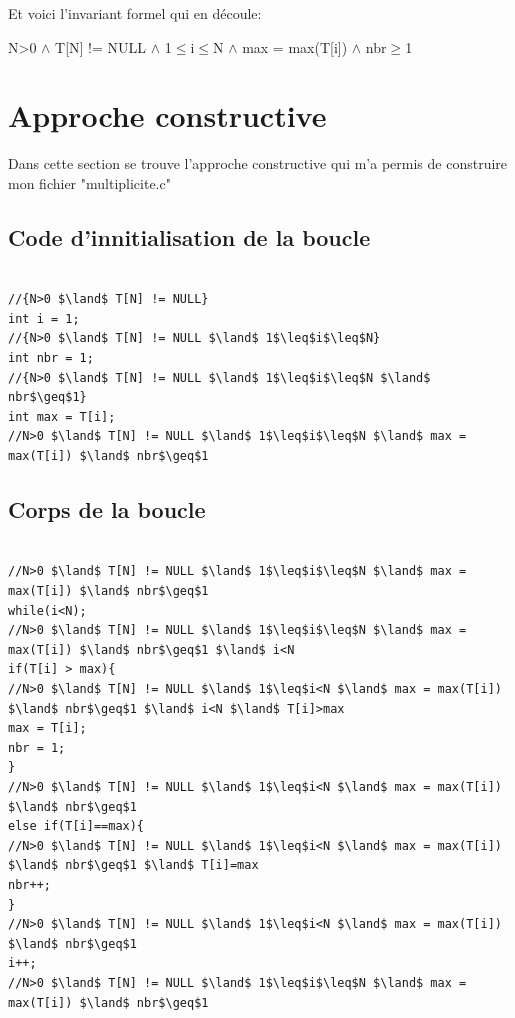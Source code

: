 \documentclass[a4paper, 11pt, oneside]{article}
\begin{document}
Et voici l'invariant formel qui en découle:

\begin{center}

N>0 $\land$ T[N] != NULL $\land$ 1$\leq$i$\leq$N $\land$ max = max(T[i]) $\land$ nbr$\geq$1

\end{center}

\section{Approche constructive}

Dans cette section se trouve l'approche constructive qui m'a permis de construire mon fichier "multiplicite.c" 
\subsection{Code d'innitialisation de la boucle}

\begin{lstlisting}[caption={Code d'innitialisation de la boucle}]

//{N>0 $\land$ T[N] != NULL}
int i = 1;
//{N>0 $\land$ T[N] != NULL $\land$ 1$\leq$i$\leq$N}
int nbr = 1;
//{N>0 $\land$ T[N] != NULL $\land$ 1$\leq$i$\leq$N $\land$ nbr$\geq$1}
int max = T[i];
//N>0 $\land$ T[N] != NULL $\land$ 1$\leq$i$\leq$N $\land$ max = max(T[i]) $\land$ nbr$\geq$1

\end{lstlisting}

\subsection{Corps de la boucle}

\begin{lstlisting}[caption={Corps de la boucle}]

//N>0 $\land$ T[N] != NULL $\land$ 1$\leq$i$\leq$N $\land$ max = max(T[i]) $\land$ nbr$\geq$1
while(i<N);
//N>0 $\land$ T[N] != NULL $\land$ 1$\leq$i$\leq$N $\land$ max = max(T[i]) $\land$ nbr$\geq$1 $\land$ i<N
if(T[i] > max){
//N>0 $\land$ T[N] != NULL $\land$ 1$\leq$i<N $\land$ max = max(T[i]) $\land$ nbr$\geq$1 $\land$ i<N $\land$ T[i]>max
max = T[i];
nbr = 1;
}
//N>0 $\land$ T[N] != NULL $\land$ 1$\leq$i<N $\land$ max = max(T[i]) $\land$ nbr$\geq$1
else if(T[i]==max){
//N>0 $\land$ T[N] != NULL $\land$ 1$\leq$i<N $\land$ max = max(T[i]) $\land$ nbr$\geq$1 $\land$ T[i]=max
nbr++;
}
//N>0 $\land$ T[N] != NULL $\land$ 1$\leq$i<N $\land$ max = max(T[i]) $\land$ nbr$\geq$1
i++;
//N>0 $\land$ T[N] != NULL $\land$ 1$\leq$i$\leq$N $\land$ max = max(T[i]) $\land$ nbr$\geq$1

\end{lstlisting}
\end{document}

